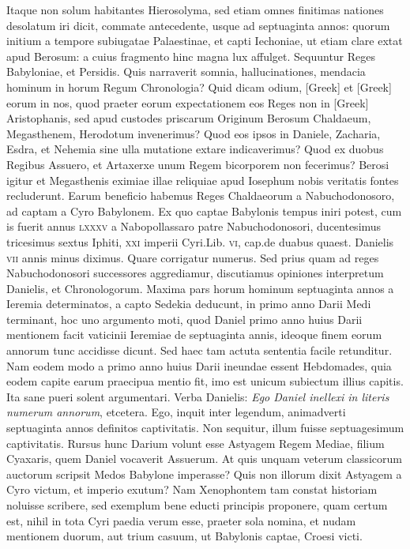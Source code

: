 Itaque non solum
habitantes Hierosolyma, sed etiam omnes finitimas nationes desolatum
iri dicit, commate antecedente, usque ad septuaginta annos:
quorum initium a tempore subiugatae Palaestinae, et capti Iechoniae,
ut etiam clare extat apud Berosum: a cuius fragmento hinc
magna lux affulget.
Sequuntur Reges Babyloniae, et Persidis.
Quis narraverit somnia, hallucinationes, mendacia hominum in horum
Regum Chronologia?
Quid dicam odium, \textgreek{[Greek]} et \textgreek{[Greek]}
eorum in nos, quod praeter eorum expectationem eos Reges non
in \textgreek{[Greek]} Aristophanis, sed apud custodes priscarum Originum
Berosum Chaldaeum, Megasthenem, Herodotum invenerimus?
Quod eos ipsos in Daniele, Zacharia, Esdra, et Nehemia sine
ulla mutatione extare indicaverimus?
Quod ex duobus Regibus
Assuero, et Artaxerxe unum Regem bicorporem non fecerimus?
Berosi igitur et Megasthenis eximiae illae reliquiae apud Iosephum
nobis veritatis fontes recluderunt.
Earum beneficio habemus Reges
Chaldaeorum a Nabuchodonosoro, ad captam a Cyro Babylonem.
Ex quo captae Babylonis tempus iniri potest, cum is fuerit annus
\textsc{lxxxv} a Nabopollassaro patre Nabuchodonosori, ducentesimus
tricesimus sextus Iphiti,
 \textsc{xxi} imperii Cyri.Lib. \textsc{vi}, cap.de duabus
quaest.
Danielis \textsc{vii} annis minus diximus.
Quare corrigatur
numerus.
Sed prius quam ad reges Nabuchodonosori successores aggrediamur,
discutiamus opiniones interpretum Danielis, et Chronologorum.
Maxima pars horum hominum septuaginta annos a
Ieremia determinatos, a capto Sedekia deducunt, in primo anno
Darii Medi terminant, hoc uno argumento moti, quod Daniel primo
anno huius Darii mentionem facit vaticinii Ieremiae de septuaginta
annis, ideoque finem eorum annorum tunc accidisse dicunt.
Sed haec tam actuta sententia facile retunditur.
Nam eodem modo
a primo anno huius Darii ineundae essent Hebdomades, quia eodem
capite earum praecipua mentio fit, imo est unicum subiectum illius
capitis.
Ita sane pueri solent argumentari.
Verba Danielis: \textit{Ego
Daniel inellexi in literis numerum annorum}, etcetera.
Ego, inquit inter
legendum, animadverti septuaginta annos definitos captivitatis.
Non sequitur, illum fuisse septuagesimum captivitatis.
Rursus hunc
Darium volunt esse Astyagem Regem Mediae, filium Cyaxaris,
quem Daniel vocaverit Assuerum.
At quis unquam veterum classicorum
auctorum scripsit Medos Babylone imperasse?
Quis non
illorum dixit Astyagem a Cyro victum, et imperio exutum?
{}
Nam Xenophontem tam constat historiam noluisse scribere, sed exemplum
bene educti principis proponere, quam certum est, nihil in tota Cyri
paedia verum esse, praeter sola nomina, et nudam mentionem duorum,
aut trium casuum, ut Babylonis captae, Croesi victi.

